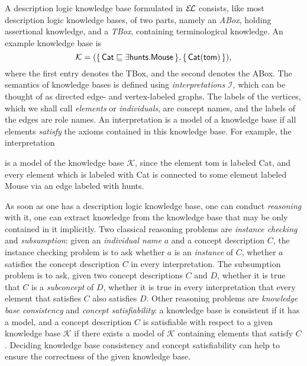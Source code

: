 A description logic knowledge base formulated in ${\mathcal{E}\kern-.3ex\mathcal{L}}$ consists, like most description
logic knowledge bases, of two parts, namely an \emph{ABox}, holding assertional knowledge,
and a \emph{TBox}, containing terminological knowledge.  An example knowledge base is
\begin{equation*}
  \mathcal{K} = ({\{\, \mathsf{Cat} \sqsubseteq \exists \mathsf{hunts}. \mathsf{Mouse} \,\}},
  {\{\, \mathsf{Cat}(\mathsf{tom}) \,\}}),
\end{equation*}
where the first entry denotes the TBox, and the second denotes the ABox.  The semantics of
knowledge bases is defined using \emph{interpretations} $\mathcal{I}$, which can be
thought of as directed edge- and vertex-labeled graphs.  The labels of the vertices, which
we shall call \emph{elements} or \emph{individuals}, are concept names, and the labels of
the edges are role names.  An interpretation is a model of a knowledge base if all
elements \emph{satisfy} the axioms contained in this knowledge base.  For example, the
interpretation
\begin{center}
\end{center}
is a model of the knowledge base $\mathcal{K}$, since the element \textsf{tom} is labeled
\textsf{Cat}, and every element which is labeled with \textsf{Cat} is connected to some
element labeled \textsf{Mouse} via an edge labeled with \textsf{hunts}.

As soon as one has a description logic knowledge base, one can conduct \emph{reasoning}
with it, \ie one can extract knowledge from the knowledge base that may be only contained
in it implicitly.  Two classical reasoning problems are \emph{instance checking} and
\emph{subsumption}: given an \emph{individual name} $a$ and a concept description $C$, the
instance checking problem is to ask whether $a$ is an \emph{instance} of $C$, \ie whether
$a$ satisfies the concept description $C$ in every interpretation.  The subsumption
problem is to ask, given two concept descriptions $C$ and $D$, whether it is true that $C$
is a \emph{subconcept} of $D$, \ie whether it is true in every interpretation that every
element that satisfies $C$ also satisfies $D$.  Other reasoning problems are
\emph{knowledge base consistency} and \emph{concept satisfiability}: a knowledge base is
consistent if it has a model, and a concept description $C$ is satisfiable with respect to
a given knowledge base $\mathcal{K}$ if there exists a model of $\mathcal{K}$ containing
elements that satisfy $C$.  Deciding knowledge base consistency and concept satisfiability
can help to ensure the correctness of the given knowledge base.

